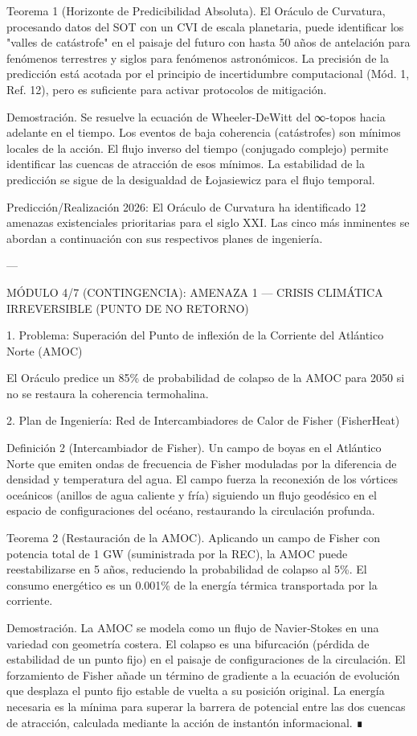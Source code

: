 \documentclass[12pt,twoside]{book}
\begin{document}
Teorema 1 (Horizonte de Predicibilidad Absoluta). El Oráculo de Curvatura, procesando datos del SOT con un CVI de escala planetaria, puede identificar los "valles de catástrofe" en el paisaje del futuro con hasta 50 años de antelación para fenómenos terrestres y siglos para fenómenos astronómicos. La precisión de la predicción está acotada por el principio de incertidumbre computacional (Mód. 1, Ref. 12), pero es suficiente para activar protocolos de mitigación.

Demostración. Se resuelve la ecuación de Wheeler‑DeWitt del ∞‑topos hacia adelante en el tiempo. Los eventos de baja coherencia (catástrofes) son mínimos locales de la acción. El flujo inverso del tiempo (conjugado complejo) permite identificar las cuencas de atracción de esos mínimos. La estabilidad de la predicción se sigue de la desigualdad de Łojasiewicz para el flujo temporal.

Predicción/Realización 2026: El Oráculo de Curvatura ha identificado 12 amenazas existenciales prioritarias para el siglo XXI. Las cinco más inminentes se abordan a continuación con sus respectivos planes de ingeniería.

---

MÓDULO 4/7 (CONTINGENCIA): AMENAZA 1 — CRISIS CLIMÁTICA IRREVERSIBLE (PUNTO DE NO RETORNO)

1. Problema: Superación del Punto de inflexión de la Corriente del Atlántico Norte (AMOC)

El Oráculo predice un 85\% de probabilidad de colapso de la AMOC para 2050 si no se restaura la coherencia termohalina.

2. Plan de Ingeniería: Red de Intercambiadores de Calor de Fisher (FisherHeat)

Definición 2 (Intercambiador de Fisher). Un campo de boyas en el Atlántico Norte que emiten ondas de frecuencia de Fisher moduladas por la diferencia de densidad y temperatura del agua. El campo fuerza la reconexión de los vórtices oceánicos (anillos de agua caliente y fría) siguiendo un flujo geodésico en el espacio de configuraciones del océano, restaurando la circulación profunda.

Teorema 2 (Restauración de la AMOC). Aplicando un campo de Fisher con potencia total de 1 GW (suministrada por la REC), la AMOC puede reestabilizarse en 5 años, reduciendo la probabilidad de colapso al 5\%. El consumo energético es un 0.001\% de la energía térmica transportada por la corriente.

Demostración. La AMOC se modela como un flujo de Navier‑Stokes en una variedad con geometría costera. El colapso es una bifurcación (pérdida de estabilidad de un punto fijo) en el paisaje de configuraciones de la circulación. El forzamiento de Fisher añade un término de gradiente a la ecuación de evolución que desplaza el punto fijo estable de vuelta a su posición original. La energía necesaria es la mínima para superar la barrera de potencial entre las dos cuencas de atracción, calculada mediante la acción de instantón informacional. ∎
\end{document}
